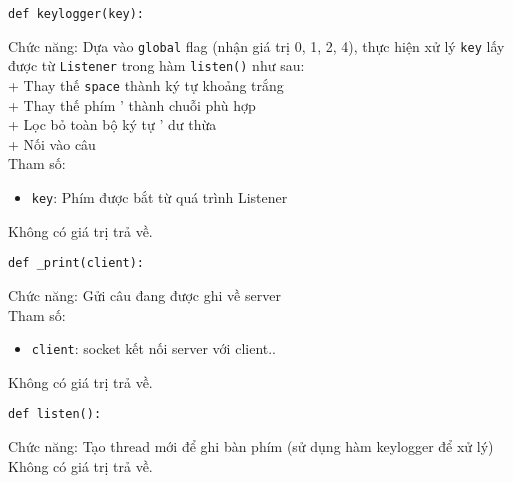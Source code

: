 \begin{itemize}
\begin{lstlisting}
def keylogger(key):
\end{lstlisting}
Chức năng: Dựa vào \lstinline{global} flag (nhận giá trị 0, 1, 2, 4), thực hiện xử lý \lstinline{key} lấy được từ \lstinline{Listener} trong hàm \lstinline{listen()} như sau:\\
+ Thay thế \lstinline{space} thành ký tự khoảng trắng\\
+ Thay thế phím ' thành chuỗi phù hợp \\
+ Lọc bỏ toàn bộ ký tự ' dư thừa \\
+ Nối vào câu \\
Tham số: 
\begin{itemize}
\item \lstinline{key}: Phím được bắt từ quá trình Listener
\end{itemize}
Không có giá trị trả về.\\

\begin{lstlisting}
def _print(client):
\end{lstlisting}
Chức năng: Gửi câu đang được ghi về server\\
Tham số: 
\begin{itemize}
\item \lstinline{client}: socket kết nối server với client..
\end{itemize}
Không có giá trị trả về.

\begin{lstlisting}
def listen():
\end{lstlisting}
Chức năng: Tạo thread mới để ghi bàn phím (sử dụng hàm keylogger để xử lý)\\
Không có giá trị trả về.\\

\end{itemize}